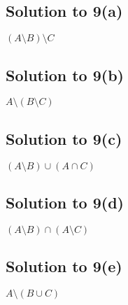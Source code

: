 \documentclass{scrartcl}
\begin{document}
    \subsection*{Solution to 9(a)}
        $(A \setminus B) \setminus C$

    \subsection*{Solution to 9(b)}
        $A \setminus (B \setminus C)$

    \subsection*{Solution to 9(c)}
        $(A \setminus B) \cup (A \cap C)$

    \subsection*{Solution to 9(d)}
        $(A \setminus B) \cap (A \setminus C)$

    \subsection*{Solution to 9(e)}
        $A \setminus (B \cup C)$
\end{document}
